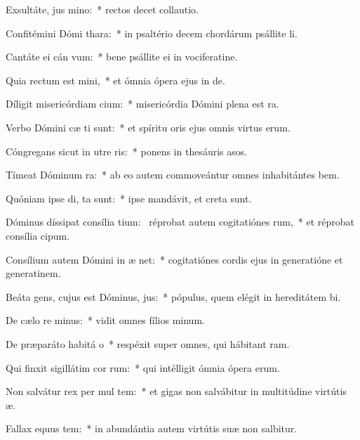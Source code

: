 \item Exsultáte, jus  mino:~* rectos decet collautio.
\item Confitémini Dómi  thara:~* in psaltério decem chordárum psállite li.
\item Cantáte ei cán vum:~* bene psállite ei in vociferatine.
\item Quia rectum est  mini,~* et ómnia ópera ejus in de.
\item Díligit misericórdiam  cium:~* misericórdia Dómini plena est ra.
\item Verbo Dómini cæ ti sunt:~* et spíritu oris ejus omnis virtus erum.
\item Cóngregans sicut in utre  ris:~* ponens in thesáuris asos.
\item Tímeat Dóminum  ra:~* ab eo autem commoveántur omnes inhabitántes bem.
\item Quóniam ipse di,  ta sunt:~* ipse mandávit, et creta sunt.
\item Dóminus díssipat consília tium:~\pscross{} réprobat autem cogitatiónes rum,~* et réprobat consília cipum.
\item Consílium autem Dómini in æ net:~* cogitatiónes cordis ejus in generatióne et generatinem.
\item Beáta gens, cujus est Dóminus,  jus:~* pópulus, quem elégit in hereditátem bi.
\item De cælo re minus:~* vidit omnes fílios minum.
\item De præparáto habitá o~* respéxit super omnes, qui hábitant ram.
\item Qui finxit sigillátim cor rum:~* qui intélligit ómnia ópera erum.
\item Non salvátur rex per mul tem:~* et gigas non salvábitur in multitúdine virtútis æ.
\item Fallax equus  tem:~* in abundántia autem virtútis suæ non salbitur.
